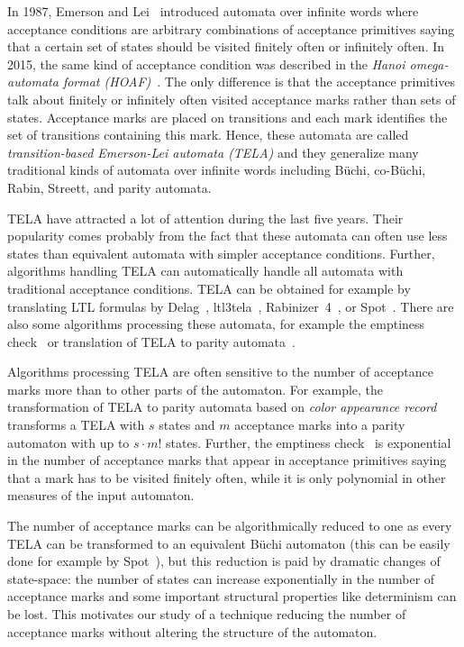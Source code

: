 \documentclass[a4paper,UKenglish,cleveref, autoref, thm-restate]{lipics-v2021}
\begin{document}
In 1987, Emerson and Lei~\cite{emerson.87.scp} introduced automata
over infinite words where acceptance conditions are arbitrary
combinations of acceptance primitives saying that a certain set of
states should be visited finitely often or infinitely often. In 2015,
the same kind of acceptance condition was described in the \emph{Hanoi
  omega-automata format (HOAF)}~\cite{babiak.15.cav}. The only
difference is that the acceptance primitives talk about finitely or
infinitely often visited acceptance marks rather than sets of states.
Acceptance marks are placed on transitions and each mark identifies
the set of transitions containing this mark. Hence, these automata are
called \emph{transition-based Emerson-Lei automata (TELA)} and they
generalize many traditional kinds of automata over infinite words
including Büchi, co-Büchi, Rabin, Streett, and parity automata.

TELA have attracted a lot of attention during the last five years.
Their popularity comes probably from the fact that these automata can
often use less states than equivalent automata with simpler acceptance
conditions. Further, algorithms handling TELA can automatically handle
all automata with traditional acceptance conditions. TELA can
be obtained for example by translating LTL formulas by
Delag~\cite{muller.17.gandalf}, ltl3tela~\cite{major.19.atva},
Rabinizer~4~\cite{kretinsky.18.cav}, or
Spot~\cite{duret.16.atva2}. There are also some algorithms processing
these automata, for example the emptiness check~\cite{baier.19.atva}
or translation of TELA to parity
automata~\cite{renkin.20.atva,casares.22.tacas}.

Algorithms processing TELA are often sensitive to the number of
acceptance marks more than to other parts of the automaton. For
example, the transformation of TELA to parity automata based on
\emph{color appearance record}~\cite{renkin.20.atva} transforms a TELA
with $s$ states and $m$ acceptance marks into a parity automaton with
up to $s\cdot m!$ states. Further, the emptiness
check~\cite{baier.19.atva} is exponential in the number of acceptance
marks that appear in acceptance primitives saying that a mark has to
be visited finitely often, while it is only polynomial in other
measures of the input automaton.

The number of acceptance marks can be algorithmically reduced to one
as every TELA can be transformed to an equivalent Büchi automaton
(this can be easily done for example by Spot~\cite{duret.16.atva2}),
but this reduction is paid by dramatic changes of state-space: the
number of states can increase exponentially in the number of
acceptance marks and some important structural properties like
determinism can be lost. This motivates our study of a technique
reducing the number of acceptance marks without altering the structure
of the automaton.
\end{document}
